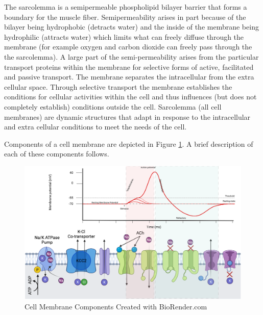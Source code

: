 The sarcolemma is a semipermeable phospholipid bilayer barrier that forms a boundary for the muscle fiber. Semipermeability arises in part because of the bilayer being hydrophobic (detracts water) and the inside of the membrane being hydrophilic (attracts water) which limits what can freely diffuse through the membrane (for example oxygen and carbon dioxide can freely pass through the the sarcolemma). A large part of the semi-permeability arises from the particular transport proteins within the membrane for selective forms of active, facilitated and passive transport.\footnotemark{} The membrane separates the intracellular from the extra cellular space. Through selective transport the membrane establishes the conditions for cellular activities within the cell and thus influences (but does not completely establish) conditions outside the cell. Sarcolemma (all cell membranes) are dynamic structures that adapt in response to the intracellular and extra cellular conditions to meet the needs of the cell.

Components of a cell membrane are depicted in Figure \ref{fig:cell_membrane}. A brief description of each of these components follows.


\begin{figure}[!ht]
    \centering
    \includegraphics[width=1\linewidth]{./figure/cell_membrane.png}
    \caption{Cell Membrane Components \footnotesize{Created with BioRender.com}}
    \label{fig:cell_membrane}
\end{figure}


